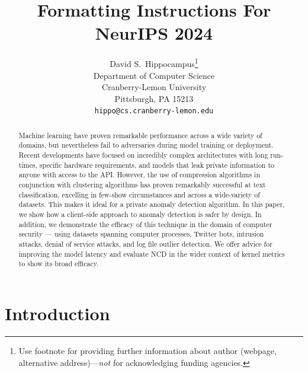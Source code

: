 \documentclass{article}
\title{Formatting Instructions For NeurIPS 2024}
\author{%
  David S.~Hippocampus\thanks{Use footnote for providing further information
    about author (webpage, alternative address)---\emph{not} for acknowledging
    funding agencies.} \\
  Department of Computer Science\\
  Cranberry-Lemon University\\
  Pittsburgh, PA 15213 \\
  \texttt{hippo@cs.cranberry-lemon.edu} \\
}
\begin{document}
\maketitle


\begin{abstract}
  Machine learning have proven remarkable performance across a wide variety of domains, but nevertheless fail to adversaries during model training or deployment. 
  Recent developments have focused on incredibly complex architectures with long run-times, specific hardware requirements, and models that leak private information to anyone with access to the API.  
  However, the use of compression algorithms in conjunction with clustering algorithms has proven remarkably successful at text classification, excelling in few-show circumstances and across a wide-variety of datasets. This makes it ideal for a private anomaly detection algorithm. In this paper, we show how a client-side approach to anomaly detection is safer by design.
  In addition, we demonstrate the efficacy of this technique in the domain of computer security --- using datasets spanning computer processes, Twitter bots, intrusion attacks, denial of service attacks, and log file outlier detection.
  We offer advice for improving the model latency and evaluate NCD in the wider context of kernel metrics to show its broad efficacy.
\end{abstract}

\section{Introduction}
\end{document}
